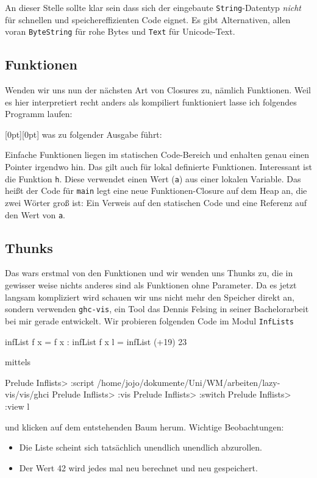 \documentclass[11pt,DIV=12,parskip=half,headings=normal,abstract]{scrartcl}
\newcommand{\mylabel}[1]{\raisebox{2em}[0pt][0pt]{\makebox[0pt][l]{\makebox[\linewidth][r]{\color{gray}{\sffamily #1}\hspace{2em}}}}\ignorespaces}
\newcommand{\li}{\lstinline[style=haskell]}
\begin{document}
An dieser Stelle sollte klar sein dass sich der eingebaute \li-String--Datentyp \emph{nicht} für schnellen und speichereffizienten Code eignet. Es gibt Alternativen, allen voran \li-ByteString- für rohe Bytes und \li-Text- für Unicode-Text.

\subsection{Funktionen}

Wenden wir uns nun der nächsten Art von Closures zu, nämlich Funktionen. Weil es hier interpretiert recht anders als kompiliert funktioniert lasse ich folgendes Programm laufen:

\mylabel{Haskell}
was zu folgender Ausgabe führt:
Einfache Funktionen liegen im statischen Code-Bereich und enhalten genau einen Pointer irgendwo hin. Das gilt auch für lokal definierte Funktionen. Interessant ist die Funktion \li-h-. Diese verwendet einen Wert (\li-a-) aus einer lokalen Variable. Das heißt der Code für \li-main- legt eine neue Funktionen-Closure auf dem Heap an, die zwei Wörter groß ist: Ein Verweis auf den statischen Code und eine Referenz auf den Wert von \li-a-. 

\subsection{Thunks}

Das wars erstmal von den Funktionen und wir wenden uns Thunks zu, die in gewisser weise nichts anderes sind als Funktionen ohne Parameter. Da es jetzt langsam kompliziert wird schauen wir uns nicht mehr den Speicher direkt an, sondern verwenden \li!ghc-vis!, ein Tool das Dennis Felsing in seiner Bachelorarbeit bei mir gerade entwickelt. Wir probieren folgenden Code im Modul \li-InfLists-
\begin{haskell}
infList f x = f x : infList f x
l = infList (+19) 23
\end{haskell}
mittels
\begin{ghci}
Prelude Inflists> :script /home/jojo/dokumente/Uni/WM/arbeiten/lazy-vis/vis/ghci
Prelude Inflists> :vis
Prelude Inflists> :switch
Prelude Inflists> :view l
\end{ghci}
und klicken auf dem entstehenden Baum herum. Wichtige Beobachtungen:
\begin{itemize}
\item Die Liste scheint sich tatsächlich unendlich unendlich abzurollen.
\item Der Wert 42 wird jedes mal neu berechnet und neu gespeichert.
\end{itemize}
\end{document}
